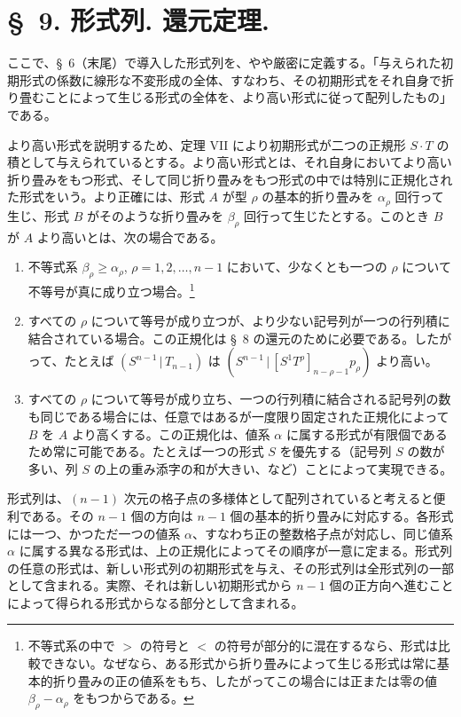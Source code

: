 \documentclass[11pt]{article}
\newcommand{\pair}[2]{(#1\,|\,#2)}
\begin{document}
\section*{\S\ 9. 形式列. 還元定理.}
ここで、\S\ 6（末尾）で導入した形式列を、やや厳密に定義する。「与えられた初期形式の係数に線形な不変形成の全体、すなわち、その初期形式をそれ自身で折り畳むことによって生じる形式の全体を、より高い形式に従って配列したもの」である。

より高い形式を説明するため、定理 VII により初期形式が二つの正規形 $S\cdot T$ の積として与えられているとする。より高い形式とは、それ自身においてより高い折り畳みをもつ形式、そして同じ折り畳みをもつ形式の中では特別に正規化された形式をいう。より正確には、形式 $A$ が型 $\rho$ の基本的折り畳みを $\alpha_\rho$ 回行って生じ、形式 $B$ がそのような折り畳みを $\beta_\rho$ 回行って生じたとする。このとき $B$ が $A$ より高いとは、次の場合である。
\begin{enumerate}
\item 不等式系 $\beta_\rho\ge\alpha_\rho$, $\rho=1,2,\ldots,n-1$ において、少なくとも一つの $\rho$ について不等号が真に成り立つ場合。\footnote{不等式系の中で $>$ の符号と $<$ の符号が部分的に混在するなら、形式は比較できない。なぜなら、ある形式から折り畳みによって生じる形式は常に基本的折り畳みの正の値系をもち、したがってこの場合には正または零の値 $\beta_\rho-\alpha_\rho$ をもつからである。}
\item すべての $\rho$ について等号が成り立つが、より少ない記号列が一つの行列積に結合されている場合。この正規化は \S\ 8 の還元のために必要である。したがって、たとえば $\pair{S^{n-1}}{T_{n-1}}$ は $\pair{S^{n-1}}{[S^1T^\rho]_{n-\rho-1}p_\rho}$ より高い。
\item すべての $\rho$ について等号が成り立ち、一つの行列積に結合される記号列の数も同じである場合には、任意ではあるが一度限り固定された正規化によって $B$ を $A$ より高くする。この正規化は、値系 $\alpha$ に属する形式が有限個であるため常に可能である。たとえば一つの形式 $S$ を優先する（記号列 $S$ の数が多い、列 $S$ の上の重み添字の和が大きい、など）ことによって実現できる。
\end{enumerate}
形式列は、$(n-1)$ 次元の格子点の多様体として配列されていると考えると便利である。その $n-1$ 個の方向は $n-1$ 個の基本的折り畳みに対応する。各形式には一つ、かつただ一つの値系 $\alpha$、すなわち正の整数格子点が対応し、同じ値系 $\alpha$ に属する異なる形式は、上の正規化によってその順序が一意に定まる。形式列の任意の形式は、新しい形式列の初期形式を与え、その形式列は全形式列の一部として含まれる。実際、それは新しい初期形式から $n-1$ 個の正方向へ進むことによって得られる形式からなる部分として含まれる。
\end{document}
